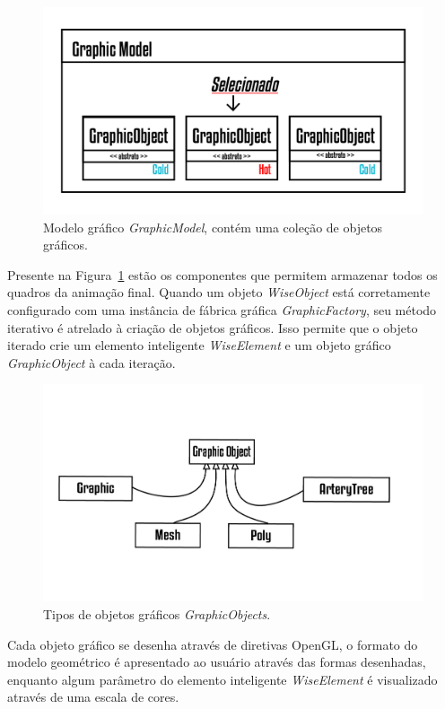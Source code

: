 \documentclass[a4paper,12pt]{monografia}
\theoremstyle{plain}
\theoremstyle{definition}
\theoremstyle{remark}
\begin{document}
\begin{figure}[!htbp]
	\centering
	\includegraphics[scale=1]{Figures/GraphicModel.png}
	\caption{Modelo gráfico \textit{GraphicModel}, contém uma coleção de objetos gráficos.}
	\label{fig7:graphicmodel}
\end{figure}

Presente na Figura~\ref{fig7:graphicmodel} estão os componentes que permitem armazenar todos os quadros da animação final. Quando um objeto \textit{WiseObject} está corretamente configurado com uma instância de fábrica gráfica \textit{GraphicFactory}, seu método iterativo é atrelado à criação de objetos gráficos. Isso permite que o objeto iterado crie um elemento inteligente \textit{WiseElement} e um objeto gráfico \textit{GraphicObject} à cada iteração.

\begin{figure}[!htbp]
	\centering
	\includegraphics[scale=1]{Figures/GraphicObjects}
	\caption{Tipos de objetos gráficos \textit{GraphicObjects}.}
	\label{fig7:graphicobjects}
\end{figure}

Cada objeto gráfico se desenha através de diretivas OpenGL, o formato do modelo geométrico é apresentado ao usuário através das formas desenhadas, enquanto algum parâmetro do elemento inteligente \textit{WiseElement} é visualizado através de uma escala de cores.
\end{document}
